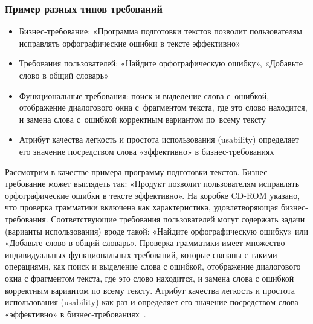 \documentclass{../industrial-development}
\begin{document}
\begin{frame} \frametitle{Пример разных типов требований}
	\begin{itemize}
	\item Бизнес-требование: «Программа подготовки текстов позволит пользователям исправлять орфографические ошибки в тексте эффективно»
	\item Требования пользователей: «Найдите орфографическую ошибку», «Добавьте слово в общий словарь»
	\item Функциональные требования: поиск и выделение слова с~ошибкой, отображение диалогового окна с~фрагментом текста, где это слово находится, и замена слова с~ошибкой корректным вариантом по~всему тексту
	\item Атрибут качества легкость и простота использования (usability) определяет его значение посредством слова «эффективно» в бизнес-требованиях
	\end{itemize}
\end{frame}

\lecturenotes

Рассмотрим в качестве примера программу подготовки текстов. Бизнес-требование может выглядеть так: «Продукт позволит пользователям исправлять орфографические ошибки в тексте эффективно». На коробке CD-ROM указано, что проверка грамматики включена как характеристика, удовлетворяющая бизнес-требования. Соответствующие требования пользователей могут содержать задачи (варианты использования) вроде такой: «Найдите орфографическую ошибку» или «Добавьте слово в общий словарь». Проверка грамматики имеет множество индивидуальных функциональных требований, которые связаны с такими операциями, как поиск и выделение слова с ошибкой, отображение диалогового окна с фрагментом текста, где это слово находится, и замена слова с ошибкой корректным вариантом по всему тексту. Атрибут качества легкость и простота использования (usability) как раз и определяет его значение посредством слова «эффективно» в бизнес-требованиях~\cite[с.~10--11]{Wiegers}.
\end{document}
